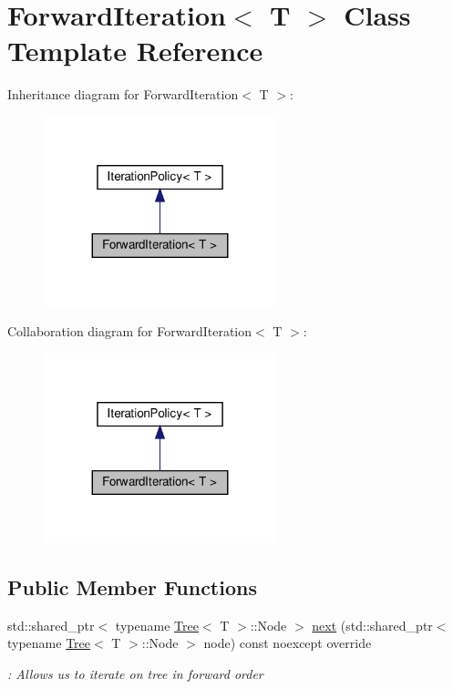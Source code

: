 \hypertarget{classForwardIteration}{}\section{Forward\+Iteration$<$ T $>$ Class Template Reference}
\label{classForwardIteration}


Inheritance diagram for Forward\+Iteration$<$ T $>$\+:\nopagebreak
\begin{figure}[H]
\begin{center}
\leavevmode
\includegraphics[width=191pt]{classForwardIteration__inherit__graph}
\end{center}
\end{figure}


Collaboration diagram for Forward\+Iteration$<$ T $>$\+:\nopagebreak
\begin{figure}[H]
\begin{center}
\leavevmode
\includegraphics[width=191pt]{classForwardIteration__coll__graph}
\end{center}
\end{figure}
\subsection*{Public Member Functions}
\begin{DoxyCompactItemize}
\item 
std\+::shared\+\_\+ptr$<$ typename \hyperlink{classTree}{Tree}$<$ T $>$\+::Node $>$ \hyperlink{classForwardIteration_aec16f756354bad563a57da6157448203}{next} (std\+::shared\+\_\+ptr$<$ typename \hyperlink{classTree}{Tree}$<$ T $>$\+::Node $>$ node) const noexcept override
\begin{DoxyCompactList}\small\item\em \+: Allows us to iterate on tree in forward order \end{DoxyCompactList}\end{DoxyCompactItemize}


